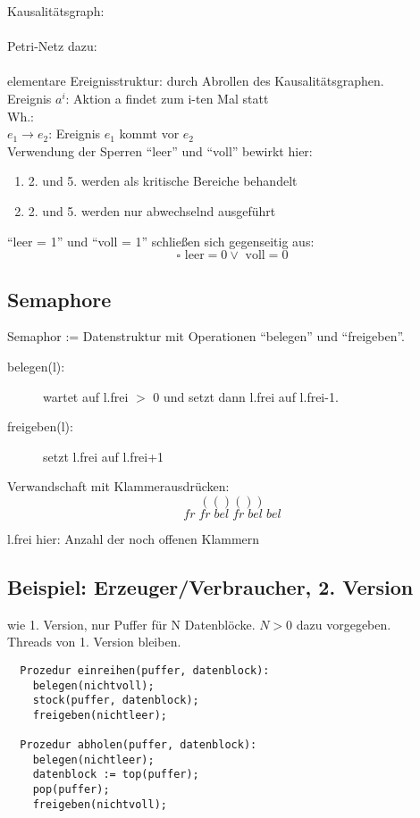 \documentclass[a4paper,12pt]{scrartcl}
\begin{document}
Kausalitätsgraph:\\
 \\
Petri-Netz dazu:\\
 \\
elementare Ereignisstruktur: durch Abrollen des Kausalitätsgraphen.\\
Ereignis $a^i$: Aktion a findet zum i-ten Mal statt\\
Wh.:\\
\quad $e_1\rightarrow e_2$: Ereignis $e_1$ kommt vor $e_2$\\



Verwendung der Sperren "`leer"' und "`voll"' bewirkt hier:
\begin{enumerate}
 \item 2. und 5. werden als kritische Bereiche behandelt
 \item 2. und 5. werden nur abwechselnd ausgeführt
\end{enumerate}

"`leer = 1"' und "`voll = 1"' schließen sich gegenseitig aus:
$$\square \text{ leer} = 0 \vee \text{ voll} = 0 $$

\subsection{Semaphore}

Semaphor := Datenstruktur mit Operationen "`belegen"' und "`freigeben"'.
\begin{description}
 \item[belegen(l):]  wartet auf l.frei $>$ 0 und setzt dann l.frei auf l.frei-1.
 \item[freigeben(l):] setzt l.frei auf l.frei+1
\end{description}

Verwandschaft mit Klammerausdrücken:
$$(()())$$
$$fr\;fr\;bel\;fr\;bel\;bel$$

l.frei hier: Anzahl der noch offenen Klammern

\subsection{Beispiel: Erzeuger/Verbraucher, 2. Version}

wie 1. Version, nur Puffer für N Datenblöcke. $N>0$ dazu vorgegeben.\\
Threads von 1. Version bleiben.
\begin{lstlisting}
  Prozedur einreihen(puffer, datenblock):
    belegen(nichtvoll);
    stock(puffer, datenblock);
    freigeben(nichtleer);
    
  Prozedur abholen(puffer, datenblock):
    belegen(nichtleer);
    datenblock := top(puffer);
    pop(puffer);
    freigeben(nichtvoll);
\end{lstlisting}
\end{document}
